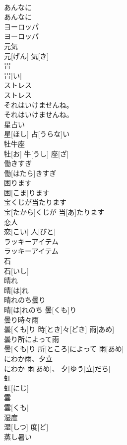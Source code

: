 \documentclass[8pt]{extreport}
\begin{document}
\begin{CJK}{UTF8}{min}
\\	あんなに	
\\	あんなに		
\\	ヨーロッパ	
\\	ヨーロッパ		
\\	元気	
\\	元[げん] 気[き]		
\\	胃	
\\	胃[い]		
\\	ストレス	
\\	ストレス		
\\	それはいけませんね。	
\\	それはいけませんね。		
\\	星占い	
\\	星[ほし] 占[うらな]い		
\\	牡牛座	
\\	牡[お] 牛[うし] 座[ざ]		
\\	働きすぎ	
\\	働[はたら]きすぎ		
\\	困ります	
\\	困[こま]ります		
\\	宝くじが当たります	
\\	宝[たから]くじが 当[あ]たります		
\\	恋人	
\\	恋[こい] 人[びと]		
\\	ラッキーアイテム	
\\	ラッキーアイテム		
\\	石	
\\	石[いし]		
\\	晴れ	
\\	晴[は]れ		
\\	晴れのち曇り	
\\	晴[は]れのち 曇[くも]り		
\\	曇り時々雨	
\\	曇[くも]り 時[とき]々[どき] 雨[あめ]		
\\	曇り所によって雨	
\\	曇[くも]り 所[ところ]によって 雨[あめ]		
\\	にわか雨、夕立	
\\	にわか 雨[あめ]、 夕[ゆう]立[だち]		
\\	虹	
\\	虹[にじ]		
\\	雲	
\\	雲[くも]		
\\	湿度	
\\	湿[しつ] 度[ど]		
\\	蒸し暑い	

\end{CJK}
\end{document}
